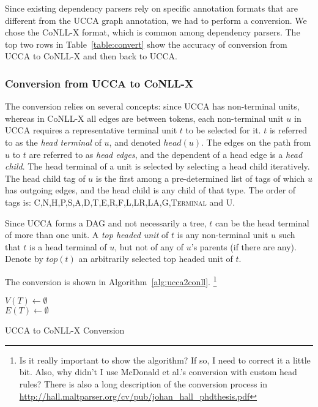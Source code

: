 \documentclass[11pt]{article}
\newcommand{\daniel}[1]{\footnote{\color{blue} #1}}
\begin{document}
Since existing dependency parsers rely on specific annotation formats that are different from the UCCA graph annotation, we had to perform a conversion. We chose the CoNLL-X format, which is common among dependency parsers.
The top two rows in Table~\ref{table:convert} show the accuracy of conversion from UCCA to CoNLL-X and then back to UCCA.

\subsubsection{Conversion from UCCA to CoNLL-X}

The conversion relies on several concepts: since UCCA has non-terminal units, whereas in CoNLL-X all edges are between tokens, each non-terminal unit $u$ in UCCA requires a representative terminal unit $t$ to be selected for it. $t$ is referred to as the \textit{head terminal} of $u$, and denoted $head(u)$. The edges on the path from $u$ to $t$ are referred to as \textit{head edges}, and the dependent of a head edge is a \textit{head child}. The head terminal of a unit is selected by selecting a head child iteratively. The head child tag of $u$ is the first among a pre-determined list of tags of which $u$ has outgoing edges, and the head child is any child of that type. The order of tags is: \textsc{C,N,H,P,S,A,D,T,E,R,F,L,LR,LA,G,Terminal} and \textsc{U}.

Since UCCA forms a DAG and not necessarily a tree, $t$ can be the head terminal of more than one unit. A \textit{top headed unit} of $t$ is any non-terminal unit $u$ such that $t$ is a head terminal of $u$, but not of any of $u$'s parents (if there are any). Denote by $top(t)$ an arbitrarily selected top headed unit of $t$.

The conversion is shown in Algorithm~\ref{alg:ucca2conll}.
\daniel{Is it really important to show the algorithm? If so, I need to correct it a little bit. Also, why didn't I use McDonald et al.'s conversion with custom head rules? There is also a long description of the conversion process in \url{http://hall.maltparser.org/cv/pub/johan_hall_phdthesis.pdf}}

\begin{algorithm}
 $V(T) \leftarrow \emptyset$\\
 $E(T) \leftarrow \emptyset$\\
 \caption{UCCA to CoNLL-X Conversion}
 \label{alg:ucca2conll}
\end{algorithm}
\end{document}
